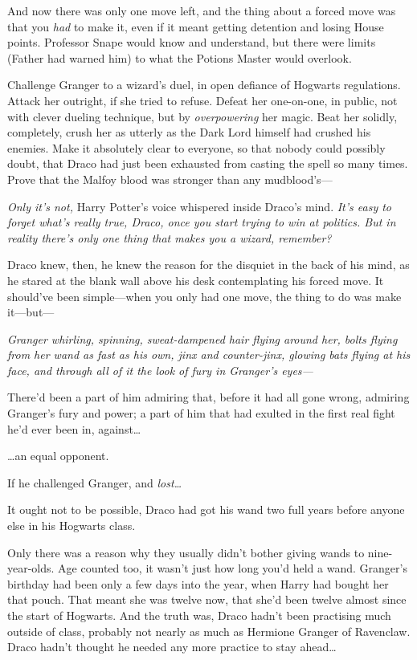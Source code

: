 And now there was only one move left, and the thing about a forced move was that you \emph{had} to make it, even if it meant getting detention and losing House points. Professor Snape would know and understand, but there were limits (Father had warned him) to what the Potions Master would overlook.

Challenge Granger to a wizard’s duel, in open defiance of Hogwarts regulations. Attack her outright, if she tried to refuse. Defeat her one-on-one, in public, not with clever dueling technique, but by \emph{overpowering} her magic. Beat her solidly, completely, crush her as utterly as the Dark Lord himself had crushed his enemies. Make it absolutely clear to everyone, so that nobody could possibly doubt, that Draco had just been exhausted from casting the spell so many times. Prove that the Malfoy blood was stronger than any mudblood’s—

\emph{Only it’s not,} Harry Potter’s voice whispered inside Draco’s mind. \emph{It’s easy to forget what’s really true, Draco, once you start trying to win at politics. But in reality there’s only one thing that makes you a wizard, remember?}

Draco knew, then, he knew the reason for the disquiet in the back of his mind, as he stared at the blank wall above his desk contemplating his forced move. It should’ve been simple—when you only had one move, the thing to do was make it—but—

\emph{Granger whirling, spinning, sweat-dampened hair flying around her, bolts flying from her wand as fast as his own, jinx and counter-jinx, glowing bats flying at his face, and through all of it the look of fury in Granger’s eyes—}

There’d been a part of him admiring that, before it had all gone wrong, admiring Granger’s fury and power; a part of him that had exulted in the first real fight he’d ever been in, against…

…an equal opponent.

If he challenged Granger, and \emph{lost…}

It ought not to be possible, Draco had got his wand two full years before anyone else in his Hogwarts class.

Only there was a reason why they usually didn’t bother giving wands to nine-year-olds. Age counted too, it wasn’t just how long you’d held a wand. Granger’s birthday had been only a few days into the year, when Harry had bought her that pouch. That meant she was twelve now, that she’d been twelve almost since the start of Hogwarts. And the truth was, Draco hadn’t been practising much outside of class, probably not nearly as much as Hermione Granger of Ravenclaw. Draco hadn’t thought he needed any more practice to stay ahead…

